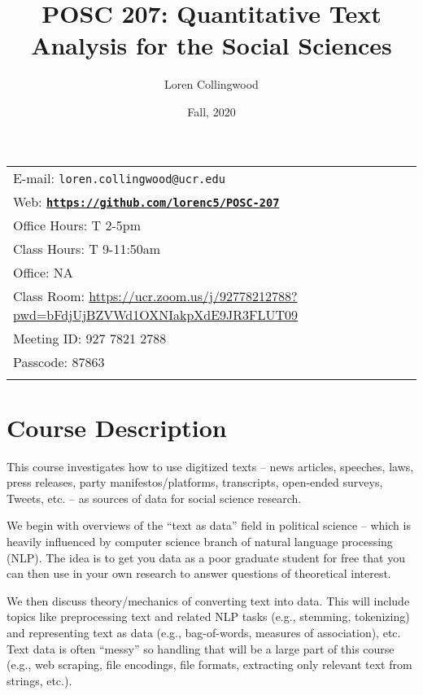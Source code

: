 \documentclass[11pt]{article}
\title{POSC 207: Quantitative Text Analysis for the Social Sciences}
\author{Loren Collingwood}
\date{Fall, 2020}
\newcommand{\blankline}{\quad\pagebreak[2]}
\begin{document}
\maketitle

\blankline

\begin{tabular*}{.93\textwidth}{@{\extracolsep{\fill}}lr}


E-mail: \texttt{loren.collingwood@ucr.edu} \\
Web: \href{https://github.com/lorenc5/POSC-207}{\tt\bf https://github.com/lorenc5/POSC-207}  \\
Office Hours: T 2-5pm \\ 
Class Hours: T 9-11:50am \\
Office: NA \\ 
Class Room: \href{https://ucr.zoom.us/j/92778212788?pwd=bFdjUjBZVWd1OXNIakpXdE9JR3FLUT09}{https://ucr.zoom.us/j/92778212788?pwd=bFdjUjBZVWd1OXNIakpXdE9JR3FLUT09} \\
Meeting ID:  927 7821 2788 \\
Passcode:  87863 \\
&  \\
\hline
\end{tabular*}

\vspace{5 mm}


\section*{Course Description}

This course investigates how to use digitized texts -- news articles, speeches, laws, press releases, party manifestos/platforms, transcripts, open-ended surveys, Tweets, etc. -- as sources of data for social science research.

We begin with overviews of the ``text as data'' field in political science -- which is heavily influenced by computer science branch of natural language processing (NLP). The idea is to get you data as a poor graduate student for free that you can then use in your own research to answer questions of theoretical interest.

We then discuss theory/mechanics of converting text into data. This will include topics like preprocessing text and related NLP tasks (e.g., stemming, tokenizing) and representing text as data (e.g., bag-of-words, measures of association), etc. Text data is often ``messy'' so handling that will be a large part of this course (e.g., web scraping, file encodings, file formats, extracting only relevant text from strings, etc.).
\end{document}
